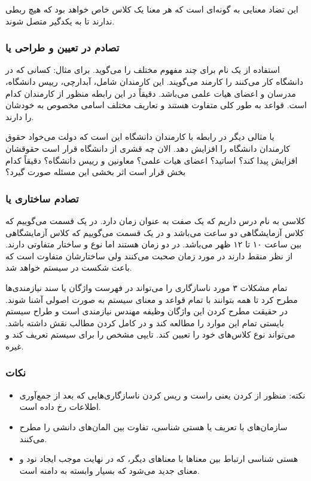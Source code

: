 این تضاد معنایی به گونه‌ای است که هر معنا یک کلاس خاص خواهد بود که هیچ ربطی
ندارند تا به یکدگیر متصل شوند.

\subsubsection{تصادم در تعیین و طراحی یا }

استفاده از یک نام برای چند مفهوم مختلف را می‌گوید.
برای مثال: کسانی که در دانشگاه کار می‌کنند را کارمند می‌گویند. این کارمندان شامل،
آبدارچی، رییس دانشگاه، مدرسان و اعضای هیات علمی می‌باشد. دقیقاً در این رابطه
منظور از کارمندان کدام است. قواعد به طور کلی متفاوت هستند و تعاریف مختلف اسامی
مخصوص به خودشان را دارند.

یا مثالی دیگر در رابطه با کارمندان دانشگاه این است که دولت می‌خواد حقوق کارمندان
دانشگاه را افزایش دهد. الان چه قشری از دانشگاه قرار است حقوقشان افزایش پیدا کند؟
اساتید؟ اعضای هیات علمی؟ معاونین و رییس دانشگاه؟ دقیقاً کدام بخش قرار است اثر
بخشی این مسئله صورت گیرد؟

\subsubsection{تصادم ساختاری یا }

کلاسی به نام درس داریم که یک صفت به عنوان زمان دارد. در یک قسمت می‌گوییم که کلاس
آزمایشگاهی دو ساعت می‌باشد و در یک قسمت می‌گوییم که کلاس آزمایشگاهی بین ساعت ۱۰
تا ۱۲ ظهر می‌باشد. در دو زمان هستند اما نوع و ساختار متفاوتی دارند. از نظر منقط
دارند در مورد زمان صحبت می‌کنند ولی ساختارشان متفاوت است که باعت شکست در سیستم
خواهد شد.

تمام مشکلات ۳ مورد ناسازگاری را می‌تواند در فهرست واژگان یا  سند
نیازمندی‌ها  مطرح کرد تا همه بتوانند با تمام قواعد و معنای سیستم به صورت
اصولی آشنا شوند. در حقیقت مطرح کردن این واژگان وظیفه مهندس نیازمندی است و طراح
سیستم بایستی تمام این موارد را مطالعه کند و در کامل کردن مطالب نقش داشته باشد.
می‌تواند نوع کلاس‌های خود را تعیین کند. تایپی مشخص را برای سیستم تعریف کند و
غیره.

\subsubsection*{نکات}

\begin{itemize}
    \item نکته: منظور از  کردن یعنی راست و ریس کردن ناسازگاری‌هایی که
    بعد از جمع‌آوری اطلاعات رخ داده است.
    \item سازمان‌های با تعریف  یا هستی شناسی، تفاوت بین المان‌‌های
    دانشی را مطرح می‌کنند.
    \item هستی شناسی ارتباط بین معنا‌ها با معنا‌های دیگر، که در نهایت موجب ایجاد
    نود و معنای جدید می‌شود که بسیار وابسته به دامنه است.
\end{itemize}

